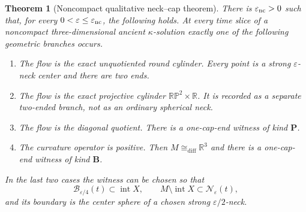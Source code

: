\documentclass[10pt]{coll-l}
\newcommand{\R}{\mathbb{R}}
\newcommand{\diffeo}{\mathrel{\cong_{\mathrm{diff}}}}
\newtheorem{theorem}{Theorem}[chapter]
\theoremstyle{definition}
\theoremstyle{remark}
\numberwithin{section}{chapter}
\numberwithin{equation}{chapter}
\begin{document}
\begin{theorem}[Noncompact qualitative neck--cap theorem]
\label{thm:ncs-noncompact-neck-cap}
There is $\varepsilon_{\rm nc}>0$ such that, for every
$0<\varepsilon\leq\varepsilon_{\rm nc}$, the following holds.  At every time slice
of a noncompact three-dimensional ancient $\kappa$-solution exactly one of
the following geometric branches occurs.
\begin{enumerate}
\item The flow is the exact unquotiented round cylinder.  Every point is a
      strong $\varepsilon$-neck center and there are two ends.
\item The flow is the exact projective cylinder
      $\mathbb{RP}^2\times\R$.  It is recorded as a separate two-ended
      branch, not as an ordinary spherical neck.
\item The flow is the diagonal quotient.  There is a one-cap-end witness
      of kind $\mathbf P$.
\item The curvature operator is positive.  Then $M\diffeo\R^3$ and there
      is a one-cap-end witness of kind $\mathbf B$.
\end{enumerate}
In the last two cases the witness can be chosen so that
\begin{equation}
       \mathscr B_{\varepsilon/4}(t)\subset
                     \operatorname{int}X,\qquad
       M\setminus\operatorname{int}X
                      \subset\mathscr N_\varepsilon(t),        \label{eq:ncs-cap-contains-bad-set}
\end{equation}
and its boundary is the center sphere of a chosen strong
$\varepsilon/2$-neck.
\end{theorem}
\end{document}
